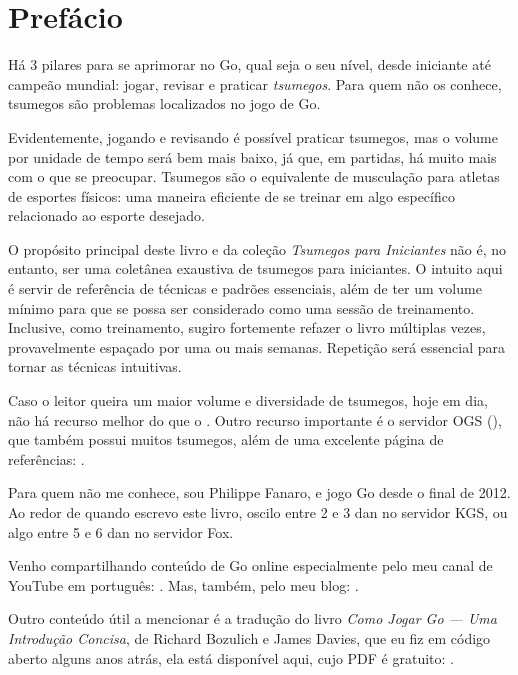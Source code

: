 \chapter{Prefácio}
  
Há 3 pilares para se aprimorar no Go, qual seja o seu nível, desde iniciante até campeão mundial: jogar, revisar e praticar \emph{tsumegos}. Para quem não os conhece, tsumegos são problemas localizados no jogo de Go.

Evidentemente, jogando e revisando é possível praticar tsumegos, mas o volume por unidade de tempo será bem mais baixo, já que, em partidas, há muito mais com o que se preocupar. Tsumegos são o equivalente de musculação para atletas de esportes físicos: uma maneira eficiente de se treinar em algo específico relacionado ao esporte desejado.

O propósito principal deste livro e da coleção \emph{Tsumegos para Iniciantes} não é, no entanto, ser uma coletânea exaustiva de tsumegos para iniciantes. O intuito aqui é servir de referência de técnicas e padrões essenciais, além de ter um volume mínimo para que se possa ser considerado como uma sessão de treinamento. Inclusive, como treinamento, sugiro fortemente refazer o livro múltiplas vezes, provavelmente espaçado por uma ou mais semanas. Repetição será essencial para tornar as técnicas intuitivas.

Caso o leitor queira um maior volume e diversidade de tsumegos, hoje em dia, não há recurso melhor do que o . Outro recurso importante é o servidor OGS (), que também possui muitos tsumegos, além de uma excelente página de referências: .

\bigskip

Para quem não me conhece, sou Philippe Fanaro, e jogo Go desde o final de 2012. Ao redor de quando escrevo este livro, oscilo entre 2 e 3 dan no servidor KGS, ou algo entre 5 e 6 dan no servidor Fox.

Venho compartilhando conteúdo de Go online especialmente pelo meu canal de YouTube em português: . Mas, também, pelo meu blog: .

Outro conteúdo útil a mencionar é a tradução do livro \emph{Como Jogar Go --- Uma Introdução Concisa}, de Richard Bozulich e James Davies, que eu fiz em código aberto alguns anos atrás, ela está disponível aqui, cujo PDF é gratuito: .

